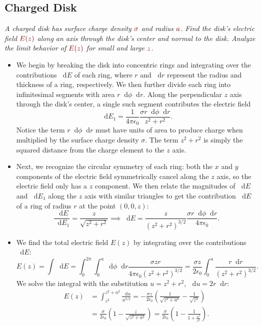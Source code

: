 \documentclass[11pt, a4paper]{article}
\newcommand{\diff}{\mathop{}\!\mathrm{d}} %
\newcommand{\dmath}[1]{\textcolor{Maroon}{#1}}  %
\newcommand{\ee}{\epsilon_{0}}  %
\begin{document}
\subsection{Charged Disk}
\textit{A charged disk has surface charge density $ \dmath{\sigma} $ and radius $ \dmath{a} $. Find the disk's electric field $ \dmath{E(z)} $ along an axis through the disk's center and normal to the disk. Analyze the limit behavior of $ \dmath{E(z)} $ for small and large $ \dmath{z} $.}
\begin{itemize}
	\item We begin by breaking the disk into concentric rings and integrating over the contributions $ \diff E $ of each ring, where $ r $ and $ \diff r $ represent the radius and thickness of a ring, respectively. We then further divide each ring into infinitesimal segments with area $ r \diff \phi \diff r $. Along the perpendicular $ z $ axis through the disk's center, a single such segment contributes the electric field
	\begin{equation*}
		\diff E_{1} = \frac{1}{4\pi \ee} \frac{\sigma r\diff \phi \diff r }{z^{2} + r^{2}}.
	\end{equation*}
	Notice the term $ r\diff \phi \diff r $ must have units of area to produce charge when multiplied by the surface charge density $ \sigma $. The term $ z^{2} + r^{2} $ is simply the squared distance from the charge element to the $ z $ axis.
	
	\item Next, we recognize the circular symmetry of each ring: both the $ x $ and $ y $ components of the electric field symmetrically cancel along the $ z $ axis, so the electric field only has a $ z $ component. We then relate the magnitudes of $ \diff E $ and $ \diff E_{1} $ along the $ z $ axis with similar triangles to get the contribution $ \diff E $ of a ring of radius $ r $ at the point $ (0, 0, z) $:
	\begin{equation*}
		\frac{\diff E}{\diff E_{1}} = \frac{z}{\sqrt{z^{2} + r^{2}}} \implies  \diff E = \frac{z}{(z^{2} + r^{2})^{3/2}} \frac{\sigma r\diff \phi \diff r }{4\pi \ee}.
	\end{equation*}
	
    \item We find the total electric field $ E(z) $ by integrating over the contributions $ \diff E $:
	\begin{equation*}
		E(z) = \int \diff E = \int_{0}^{2\pi}\int_{0}^{a}\diff \phi \diff r \frac{\sigma z r}{4\pi \ee (z^{2} + r^{2})^{3/2}} = \frac{\sigma z}{2\ee} \int_{0}^{a}\frac{r \diff r}{(z^{2} + r^{2})^{3/2}}.
	\end{equation*}
	We solve the integral with the substitution $ u = z^{2} + r^{2} $, $\diff u = 2r \diff r $:
	\begin{align*}
		E(z) &= \int_{z^{2}}^{z^{2} + a^{2}} \frac{\diff u}{u^{3/2}} = -\frac{\sigma z}{2 \ee} \left(\frac{1}{\sqrt{z^{2} + a^{2}}} - \frac{1}{\sqrt{z^{2}}}\right)\\
		&=\frac{\sigma}{2\ee} \left(1 - \frac{z}{\sqrt{z^{2} + a^{2}}}\right) = \frac{\sigma}{2\ee} \left(1 - \frac{1}{1 + \frac{a^{2}}{z^{2}}}\right).
	\end{align*}
	

\end{itemize}
\end{document}
